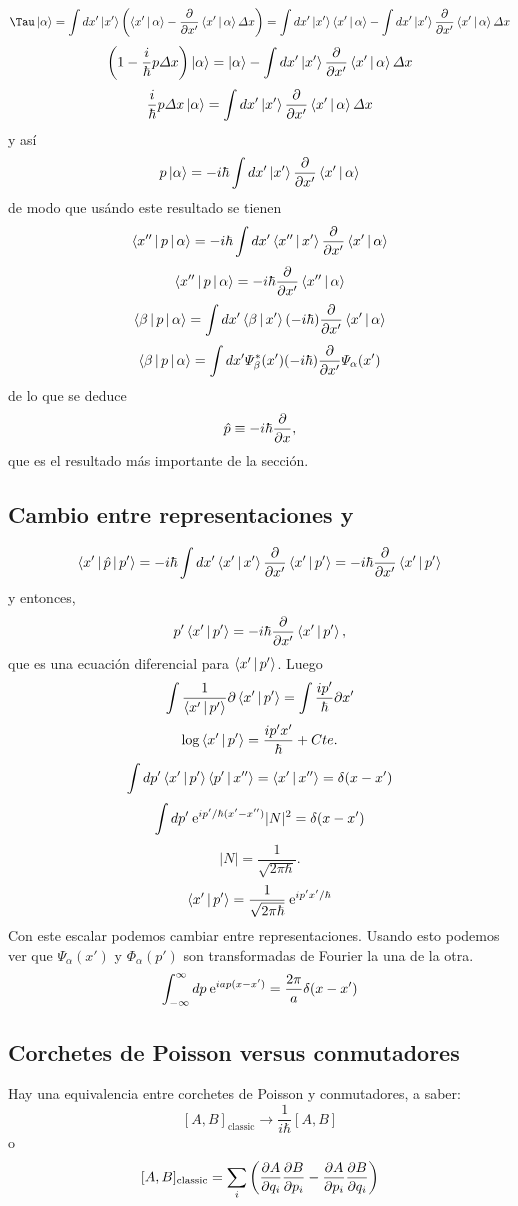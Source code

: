 \documentclass[10pt,oneside]{CBFT_book}
\begin{document}
\[
	\Tau\Ket{\alpha} = \int dx' \Ket{x'}\left( \Braket{x'|\alpha} -\dpar{}{x'} \Braket{x'|\alpha} \Delta x \right) =
	\int dx' \Ket{x'} \Braket{x'|\alpha} - \int dx' \Ket{x'}  \dpar{}{x'} \Braket{x'|\alpha} \Delta x 
\]
\[
	\left( 1 - \frac{i}{\hbar}p\Delta x \right) \Ket{\alpha} = 
		\Ket{\alpha} - \int dx' \Ket{x'}  \frac{\partial^{\hspace{-0.05em}} {}}{\partial {x'}^{\hspace{-0.05em}}} \Braket{x'|\alpha} \Delta x
\]
\[
	\frac{i}{\hbar}p\Delta x \Ket{\alpha} = \int dx' \Ket{x'}  \frac{\partial^{\hspace{-0.05em}} {}}{\partial {x'}^{\hspace{-0.05em}}} \Braket{x'|\alpha} \Delta x
\]
y así
\[
	p\Ket{\alpha} = -i\hbar \int dx' \Ket{x'}  \frac{\partial^{\hspace{-0.05em}} {}}{\partial {x'}^{\hspace{-0.05em}}} \Braket{x'|\alpha}
\]
de modo que usándo este resultado se tienen
\[
	\Braket{x''|p|\alpha} = -i\hbar \int dx' \Braket{x''|x'}  \frac{\partial^{\hspace{-0.05em}} {}}{\partial {x'}^{\hspace{-0.05em}}} \Braket{x'|\alpha}
\]
\[
	\Braket{x''|p|\alpha} = -i\hbar \frac{\partial^{\hspace{-0.05em}} {}}{\partial {x'}^{\hspace{-0.05em}}} \Braket{x''|\alpha}
\]
\[
	\Braket{\beta|p|\alpha} = \int dx' \Braket{\beta|x'} (-i\hbar) \frac{\partial^{\hspace{-0.05em}} {}}{\partial {x'}^{\hspace{-0.05em}}} \Braket{x'|\alpha}
\]
\[
	\Braket{\beta|p|\alpha} = \int dx' \Psi_\beta^*(x') (-i\hbar) \frac{\partial^{\hspace{-0.05em}} {}}{\partial {x'}^{\hspace{-0.05em}}} \Psi_\alpha(x')
\]
de lo que se deduce 
\[
	\hat{p} \equiv - i \hbar \frac{\partial^{\hspace{-0.05em}} {}}{\partial {x}^{\hspace{-0.05em}}},
\]
que es el resultado más importante de la sección.

\subsection{Cambio entre representaciones  y  }

\[
	\Braket{x'|\hat{p}|p'} =  -i\hbar \int dx'  \Braket{x'|x'} \frac{\partial^{\hspace{-0.05em}} {}}{\partial {x'}^{\hspace{-0.05em}}} \Braket{x'|p'} =
	-i\hbar \frac{\partial^{\hspace{-0.05em}} {}}{\partial {x'}^{\hspace{-0.05em}}} \Braket{x'|p'}
\]
y entonces,
\[
	p' \Braket{x'|p'} = -i\hbar \frac{\partial^{\hspace{-0.05em}} {}}{\partial {x'}^{\hspace{-0.05em}}} \Braket{x'|p'},
\]
que es una ecuación diferencial para $\Braket{x'|p'}$. Luego
\[
	\int  \frac{1}{\Braket{x'|p'}} \partial \Braket{x'|p'} = \int \frac{ip'}{\hbar} \partial x'
\]
\[
	\log \Braket{x'|p'} = \frac{ip'x'}{\hbar} + Cte.
\]
\[
	\int dp' \Braket{x'|p'} \Braket{p'|x''} = \Braket{x'|x''} = \delta(x-x')
\]
\[
	\int dp' \:\mathrm{e}^{ip'/\hbar(x'-x'')} |N|^2 = \delta(x-x')
\]
\[
	|N| = \frac{1}{\sqrt{2\pi\hbar}}.
\]
\[
	\Braket{x'|p'} = \frac{1}{\sqrt{2\pi\hbar}} \:\mathrm{e}^{i p'x'/\hbar}
\]
Con este escalar podemos cambiar entre representaciones.
Usando esto podemos ver que $\Psi_\alpha(x')$ y $\Phi_\alpha(p')$ son transformadas de Fourier la una de la otra.
\[
	 \int_{-\infty}^\infty dp \:\mathrm{e}^{iap(x-x')} = \frac{2\pi}{a}\delta(x-x')
\]

\subsection{Corchetes de Poisson versus conmutadores}

Hay una equivalencia entre corchetes de Poisson y conmutadores, a saber:
\[
	[A, B]_{\text{classic}} \longrightarrow \frac{1}{i\hbar}[A,B]
\]
o
\[
	[A, B]_{\text{classic}} = \sum_i \left( \frac{\partial^{\hspace{-0.05em}} {A}}{\partial {q_i}^{\hspace{-0.05em}}} \frac{\partial^{\hspace{-0.05em}} {B}}{\partial {p_i}^{\hspace{-0.05em}}} - \frac{\partial^{\hspace{-0.05em}} {A}}{\partial {p_i}^{\hspace{-0.05em}}} \frac{\partial^{\hspace{-0.05em}} {B}}{\partial {q_i}^{\hspace{-0.05em}}} \right)
\]

\end{document}
